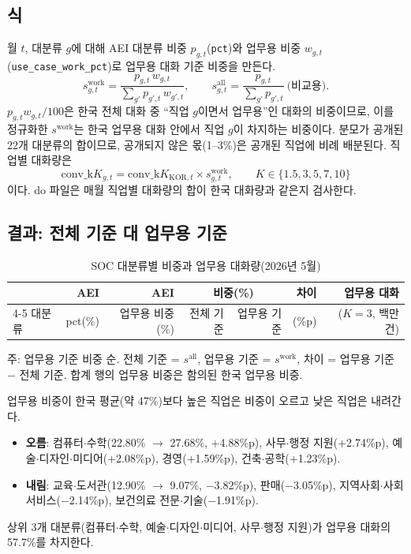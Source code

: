 \documentclass[11pt]{article}
\begin{document}
\subsection{식}
월 $t$, 대분류 $g$에 대해 AEI 대분류 비중 $p_{g,t}$(\texttt{pct})와 업무용 비중 $w_{g,t}$(\texttt{use\_case\_work\_pct})로 업무용 대화 기준 비중을 만든다.
\[
  s^{\text{work}}_{g,t} = \frac{p_{g,t}\, w_{g,t}}{\sum_{g'} p_{g',t}\, w_{g',t}}, \qquad
  s^{\text{all}}_{g,t} = \frac{p_{g,t}}{\sum_{g'} p_{g',t}} \ \text{(비교용)} .
\]
$p_{g,t} w_{g,t}/100$은 한국 전체 대화 중 ``직업 $g$이면서 업무용''인 대화의 비중이므로, 이를 정규화한 $s^{\text{work}}$는 한국 업무용 대화 안에서 직업 $g$이 차지하는 비중이다. 분모가 공개된 22개 대분류의 합이므로, 공개되지 않은 몫(1--3\%)은 공개된 직업에 비례 배분된다. 직업별 대화량은
\[
  \text{conv\_k}K_{g,t} = \text{conv\_k}K_{\text{KOR},t} \times s^{\text{work}}_{g,t}, \qquad K \in \{1.5, 3, 5, 7, 10\}
\]
이다. do 파일은 매월 직업별 대화량의 합이 한국 대화량과 같은지 검사한다.

\subsection{결과: 전체 기준 대 업무용 기준}
\begin{table}[htbp]
\centering
\small
\caption{SOC 대분류별 비중과 업무용 대화량(2026년 5월)}\label{tab:major}
\begin{tabular}{lrrrrrr}
\toprule
 & AEI & AEI & \multicolumn{2}{c}{비중(\%)} & 차이 & 업무용 대화 \\
\cmidrule(lr){4-5}
대분류 & pct(\%) & 업무용 비중(\%) & 전체 기준 & 업무용 기준 & (\%p) & ($K=3$, 백만 건) \\
\midrule

\bottomrule
\end{tabular}
\par\smallskip\footnotesize 주: 업무용 기준 비중 순. 전체 기준 = $s^{\text{all}}$, 업무용 기준 = $s^{\text{work}}$, 차이 = 업무용 기준 $-$ 전체 기준. 합계 행의 업무용 비중은 함의된 한국 업무용 비중.
\end{table}

업무용 비중이 한국 평균(약 47\%)보다 높은 직업은 비중이 오르고 낮은 직업은 내려간다.
\begin{itemize}
  \item \textbf{오름}: 컴퓨터$\cdot$수학(22.80\% $\to$ 27.68\%, +4.88\%p), 사무$\cdot$행정 지원(+2.74\%p), 예술$\cdot$디자인$\cdot$미디어(+2.08\%p), 경영(+1.59\%p), 건축$\cdot$공학(+1.23\%p).
  \item \textbf{내림}: 교육$\cdot$도서관(12.90\% $\to$ 9.07\%, $-$3.82\%p), 판매($-$3.05\%p), 지역사회$\cdot$사회서비스($-$2.14\%p), 보건의료 전문$\cdot$기술($-$1.91\%p).
\end{itemize}
상위 3개 대분류(컴퓨터$\cdot$수학, 예술$\cdot$디자인$\cdot$미디어, 사무$\cdot$행정 지원)가 업무용 대화의 57.7\%를 차지한다.
\end{document}
